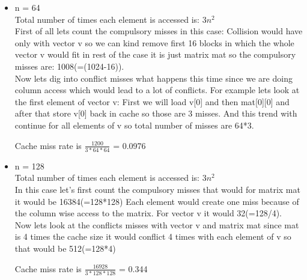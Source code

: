 \documentclass[letterpaper, 11pt]{article}
\begin{document}
\begin{itemize}
\item n = 64 \\
Total number of times each element is accessed is: $3n^2$ \\
First of all lets count the compulsory misses in this case:
Collision would have only with vector v so we can kind remove first 16 blocks in which the whole vector v would fit in rest of the case it is just matrix mat so the compulsory misses are: 1008(=(1024-16)). \\
Now lets dig into conflict misses what happens this time since we are doing column access which would lead to a lot of conflicts. For example lets look at the first element of vector v: First we will load v[0] and then mat[0][0] and after that store v[0] back in cache so those are 3 misses. And this trend with continue for all elements of v so total number of misses are 64*3. \begin{center} Cache miss rate is $\frac{1200}{3*64*64}$ = 0.0976 \end{center}
\item n = 128 \\
Total number of times each element is accessed is: $3n^2$ \\
In this case let's first count the compulsory misses that would for matrix mat it would be 16384(=128*128) Each element would create one miss because of the column wise access to the matrix. For vector v it would 32(=128/4). \\ Now lets look at the conflicts misses with vector v and matrix mat since mat is 4 times the cache size it would conflict 4 times with each element of v so that would be 512(=128*4) \begin{center}Cache miss rate is $\frac{16928}{3*128*128}$ = 0.344 \end{center}
\end{itemize}
\bigskip
\end{document}
